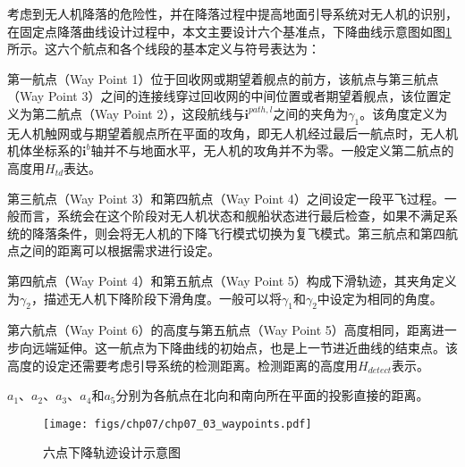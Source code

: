 考虑到无人机降落的危险性，并在降落过程中提高地面引导系统对无人机的识别，在固定点降落曲线设计过程中，本文主要设计六个基准点，下降曲线示意图如图\ref{fig:chp07_03_waypoints}所示。这六个航点和各个线段的基本定义与符号表达为：
\begin{compactenum}
	\item 第一航点（Way Point 1）位于回收网或期望着舰点的前方，该航点与第三航点（Way Point 3）之间的连接线穿过回收网的中间位置或者期望着舰点，该位置定义为第二航点（Way Point 2），这段航线与$\mathbf{i}^{path,l}$之间的夹角为$\gamma_1$。该角度定义为无人机触网或与期望着舰点所在平面的攻角，即无人机经过最后一航点时，无人机机体坐标系的$\mathbf{i}^{b}$轴并不与地面水平，无人机的攻角并不为零。一般定义第二航点的高度用$H_{td}$表达。
	\item 第三航点（Way Point 3）和第四航点（Way Point 4）之间设定一段平飞过程。一般而言，系统会在这个阶段对无人机状态和舰船状态进行最后检查，如果不满足系统的降落条件，则会将无人机的下降飞行模式切换为复飞模式。第三航点和第四航点之间的距离可以根据需求进行设定。
	\item 第四航点（Way Point 4）和第五航点（Way Point 5）构成下滑轨迹，其夹角定义为$\gamma_2$，描述无人机下降阶段下滑角度。一般可以将$\gamma_1$和$\gamma_2$中设定为相同的角度。
	\item 第六航点（Way Point 6）的高度与第五航点（Way Point 5）高度相同，距离进一步向远端延伸。这一航点为下降曲线的初始点，也是上一节进近曲线的结束点。该高度的设定还需要考虑引导系统的检测距离。检测距离的高度用$H_{detect}$表示。
	\item $a_1$、$a_2$、$a_3$、$a_4$和$a_5$分别为各航点在北向和南向所在平面的投影直接的距离。
\end{compactenum}

\begin{figure}[ht]   
	\centering
	\texttt{[image: figs/chp07/chp07\_03\_waypoints.pdf]}
	\caption{六点下降轨迹设计示意图}
	\label{fig:chp07_03_waypoints}
\end{figure}



